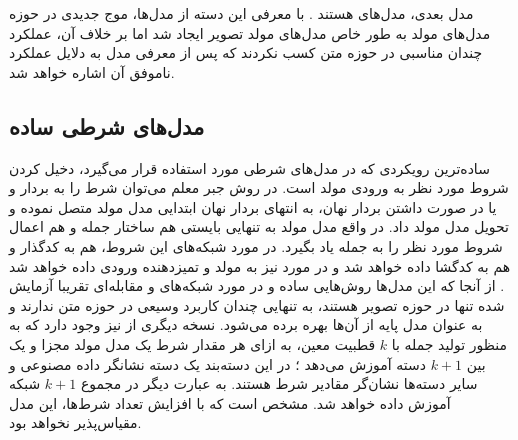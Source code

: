 مدل بعدی، مدل‌های
هستند \cite{vae-org}. با معرفی این دسته از مدل‌ها، موج جدیدی در حوزه مدل‌های مولد به طور خاص مدل‌های مولد تصویر ایجاد شد اما بر خلاف آن، عملکرد چندان مناسبی در حوزه متن کسب نکردند \cite{vae-text} که پس از معرفی مدل به دلایل عملکرد ناموفق آن اشاره خواهد شد.\\
\subsection{مدل‌های شرطی ساده}
ساده‌ترین رویکردی که در مدل‌های شرطی مورد استفاده قرار می‌گیرد، دخیل کردن شروط مورد نظر به ورودی مولد است. در روش جبر معلم می‌توان شرط را به بردار  و  یا در صورت داشتن بردار نهان، به انتهای بردار نهان ابتدایی مدل مولد متصل نموده و تحویل مدل مولد داد. در واقع مدل مولد به تنهایی بایستی هم ساختار جمله و هم اعمال شروط مورد نظر را به جمله یاد بگیرد. در مورد شبکه‌های \vae{} این شروط، هم به کدگذار و هم به کدگشا داده خواهد شد \cite{cvae} و در مورد\gan{} نیز به مولد و تمیزدهنده ورودی داده خواهد شد \cite{cgan}. از آنجا که این مدل‌ها روش‌هایی ساده و در مورد شبکه‌های \vae{} و مقابله‌ای تقریبا آزمایش شده تنها در حوزه تصویر هستند، به تنهایی چندان کاربرد وسیعی در حوزه متن ندارند و به عنوان مدل پایه از آن‌ها بهره برده ‌می‌شود. نسخه دیگری از \gan{} نیز وجود دارد که به منظور تولید جمله با $k$ قطبیت معین، به ازای هر مقدار شرط یک مدل مولد مجزا و یک  بین $k+1$ دسته آموزش می‌دهد \cite{sentigan}؛ در این دسته‌بند یک دسته نشانگر داده مصنوعی و سایر دسته‌ها نشان‌گر مقادیر شرط هستند. به عبارت دیگر در مجموع $k+1$ شبکه آموزش داده خواهد شد. مشخص است که با افزایش تعداد شرط‌ها، این مدل مقیاس‌پذیر نخواهد بود.
